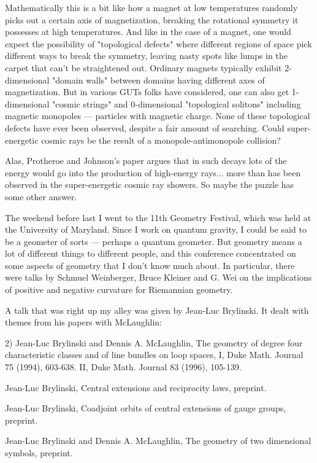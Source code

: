 Mathematically this is a bit like how a magnet at low temperatures
randomly picks out a certain axis of magnetization, breaking the
rotational symmetry it possesses at high temperatures.  And like in the
case of a magnet, one would expect the possibility of "topological
defects" where different regions of space pick different ways to break
the symmetry, leaving nasty spots like lumps in the carpet that can't be
straightened out.  Ordinary magnets typically exhibit 2-dimensional
"domain walls" between domains having different axes of magnetization.
But in various GUTs folks have considered, one can also get
1-dimensional "cosmic strings" and 0-dimensional "topological solitons"
including magnetic monopoles --- particles with magnetic charge.
None of these topological defects have ever been observed, despite a
fair amount of searching.   Could super-energetic cosmic rays be the
result of a monopole-antimonopole collision?   

Alas, Protheroe and Johnson's paper argues that in such decays lots of
the energy would go into the production of high-energy \gamma  rays...
more than has been observed in the super-energetic cosmic ray showers.
So maybe the puzzle has some other answer.


The weekend before last I went to the 11th Geometry Festival, which was
held at the University of Maryland.  Since I work on quantum gravity, I
could be said to be a geometer of sorts --- perhaps a quantum geometer.
But geometry means a lot of different things to different people, and
this conference concentrated on some aspects of geometry that I don't
know much about.  In particular, there were talks by Schmuel Weinberger,
Bruce Kleiner and G. Wei on the implications of positive and negative
curvature for Riemannian geometry.  

A talk that was right up my alley was given by Jean-Luc Brylinski.  It
dealt with themes from his papers with McLaughlin:

2) Jean-Luc Brylinski and Dennis A. McLaughlin, The geometry of degree
four characteristic classes and of line bundles on loop spaces, I,
Duke Math. Journal 75 (1994), 603-638.  II, Duke Math. Journal 83 (1996), 
105-139.  

Jean-Luc Brylinski, Central extensions and reciprocity laws, preprint.

Jean-Luc Brylinski, Coadjoint orbits of central extensions of gauge
groups, preprint.

Jean-Luc Brylinski and Dennis A. McLaughlin, The geometry of two
dimensional symbols, preprint.


